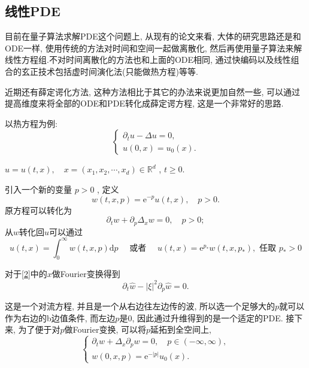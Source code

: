 \subsection{线性PDE}
目前在量子算法求解PDE这个问题上, 从现有的论文来看, 大体的研究思路还是和ODE一样, 使用传统的方法对时间和空间一起做离散化, 然后再使用量子算法来解线性方程组.不对时间离散化的方法也和上面的ODE相同, 通过快编码以及线性组合的玄正技术包括虚时间演化法(只能做热方程)\cite{38}等等.\par 近期还有薛定谔化方法\cite{39}, 这种方法相比于其它的办法来说更加自然一些, 可以通过提高维度来将全部的ODE和PDE转化成薛定谔方程, 这是一个非常好的思路.\par 以热方程为例:
\begin{equation}
	\left\{\begin{array}{l}
		\partial_t u-\Delta u=0, \\
		u(0, x)=u_0(x).
	\end{array}\right.
\end{equation}
\begin{center}
	$u=u(t, x), \quad x=\left(x_1, x_2, \cdots, x_d\right) \in \mathbb{R}^d$ , \quad  $t \geq 0$.
\end{center}
引入一个新的变量 $p>0$ , 定义
\begin{equation}
	w(t, x, p)=\mathrm{e}^{-p} u(t, x), \quad p>0 .
\end{equation}
原方程可以转化为
\begin{equation}\label{2}
	\partial_t w+\partial_p \Delta_x w=0, \quad p>0 ;
\end{equation}
从$w$转化回$u$可以通过
\begin{equation}
	u(t, x)=\int_0^{\infty} w(t, x, p) \mathrm{d} p \quad \text { 或者 } \quad u(t, x)=\mathrm{e}^{p_*} w\left(t, x, p_*\right) , \text { 任取 } p_*>0
\end{equation}

对于\cref{2}中的$x$做Fourier变换得到 
\begin{equation}
	\partial_t \hat{w}-|\xi|^2 \partial_p \hat{w}=0.
\end{equation}

这是一个对流方程, 并且是一个从右边往左边传的波, 所以选一个足够大的$p$就可以作为右边的b边值条件, 而左边$p$是0, 因此通过升维得到的是一个适定的PDE.
接下来, 为了便于对$p$做Fourier变换, 可以将$p$延拓到全空间上, 
\begin{equation}
	\left\{\begin{array}{l}
		\partial_t w+\Delta_x \partial_p w=0, \quad p \in(-\infty, \infty), \\
		w(0, x, p)=\mathrm{e}^{-|p|} u_0(x) .
	\end{array}\right.
\end{equation}

